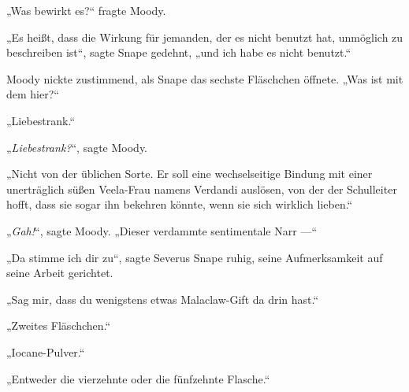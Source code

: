 „Was bewirkt es?“ fragte Moody.

„Es heißt, dass die Wirkung für jemanden, der es nicht benutzt hat, unmöglich zu beschreiben ist“, sagte Snape gedehnt, „und ich habe es nicht benutzt.“

Moody nickte zustimmend, als Snape das sechste Fläschchen öffnete.
„Was ist mit dem hier?“

„Liebestrank.“

„\emph{Liebestrank?}“, sagte Moody.

„Nicht von der üblichen Sorte. Er soll eine wechselseitige Bindung mit einer unerträglich süßen Veela-Frau namens Verdandi auslösen, von der der Schulleiter hofft, dass sie sogar ihn bekehren könnte, wenn sie sich wirklich lieben.“

„\emph{Gah!}“, sagte Moody.
„Dieser verdammte sentimentale Narr —“

„Da stimme ich dir zu“, sagte Severus Snape ruhig, seine Aufmerksamkeit auf seine Arbeit gerichtet.

„Sag mir, dass du wenigstens etwas Malaclaw-Gift da drin hast.“

„Zweites Fläschchen.“

„Iocane-Pulver.“

„Entweder die vierzehnte oder die fünfzehnte Flasche.“

